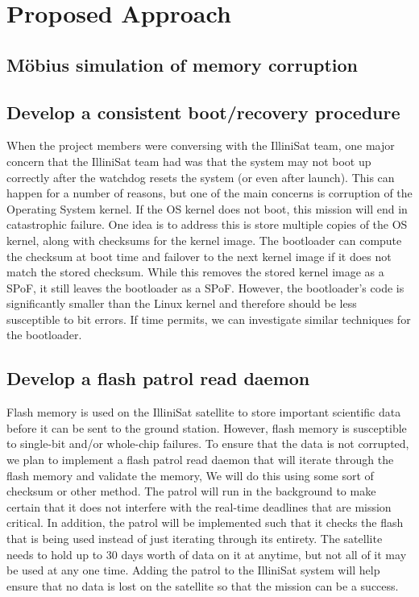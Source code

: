 \section{Proposed Approach}
\subsection{M\"obius simulation of memory corruption}

\subsection{Develop a consistent boot/recovery procedure}
When the project members were conversing with the IlliniSat team, one major
concern that the IlliniSat team had was that the system may not boot up
correctly after the watchdog resets the system (or even after launch).  This can
happen for a number of reasons, but one of the main concerns is corruption of
the Operating System kernel.  If the OS kernel does not boot, this mission will
end in catastrophic failure.  One idea is to address this is store multiple
copies of the OS kernel, along with checksums for the kernel image.  The
bootloader can compute the checksum at boot time and failover to the next kernel
image if it does not match the stored checksum.  While this removes the stored
kernel image as a SPoF, it still leaves the bootloader as a SPoF.  However, the
bootloader's code is significantly smaller than the Linux kernel and therefore
should be less susceptible to bit errors.  If time permits, we can investigate
similar techniques for the bootloader. 

\subsection{Develop a flash patrol read daemon}
Flash memory is used on the IlliniSat satellite to store important scientific data before it can be sent to the ground station. However, flash memory is susceptible to single-bit and/or whole-chip failures. To ensure that the data is not corrupted, we plan to implement a flash patrol read daemon that will iterate through the flash memory and validate the memory, We will do this using some sort of checksum or other method. The patrol will run in the background to make certain that it does not interfere with the real-time deadlines that are mission critical. In addition, the patrol will be implemented such that it checks the flash that is being used instead of just iterating through its entirety. The satellite needs to hold up to 30 days worth of data on it at anytime, but not all of it may be used at any one time. Adding the patrol to the IlliniSat system will help ensure that no data is lost on the satellite so that the mission can be a success. 

